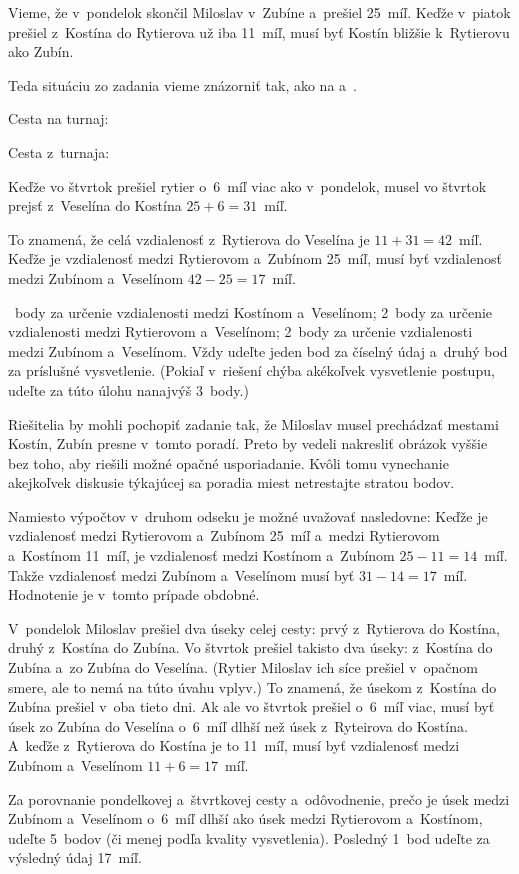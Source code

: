 {%
Vieme, že v~pondelok skončil Miloslav v~Zubíne a~prešiel 25~míľ.
Keďže v~piatok prešiel z~Kostína do Rytierova už iba 11~míľ, musí byť Kostín
bližšie k~Rytierovu ako Zubín.

Teda situáciu zo zadania vieme znázorniť tak, ako na \obr{} a~\obrnum.

Cesta na turnaj:
%

Cesta z~turnaja:
%

Keďže vo štvrtok prešiel rytier o~6~míľ viac ako v~pondelok, musel vo štvrtok
prejsť z~Veselína do Kostína $25 + 6 = 31$~míľ.

To znamená, že celá vzdialenosť z~Rytierova do Veselína je $11 + 31 = 42$~míľ.
Keďže je vzdialenosť medzi Rytierovom a~Zubínom 25~míľ, musí byť vzdialenosť
medzi Zubínom a~Veselínom $42 - 25 = 17$~míľ.


~body za určenie vzdialenosti medzi Kostínom a~Veselínom;
2~body za určenie vzdialenosti medzi Rytierovom a~Veselínom;
2~body za určenie vzdialenosti medzi Zubínom a~Veselínom.
Vždy udeľte jeden bod za číselný údaj a~druhý bod za príslušné vysvetlenie.
(Pokiaľ v~riešení chýba akékoľvek vysvetlenie postupu, udeľte za túto úlohu
nanajvýš 3~body.)
\endhodnotenie

\poznamka
Riešitelia by mohli pochopiť zadanie tak, že Miloslav musel prechádzať
mestami Kostín, Zubín presne v~tomto poradí. Preto by vedeli nakresliť obrázok vyššie
bez toho, aby riešili možné opačné usporiadanie. Kvôli tomu vynechanie akejkoľvek diskusie
týkajúcej sa poradia miest netrestajte stratou bodov.

\poznamka
Namiesto výpočtov v~druhom odseku je možné uvažovať nasledovne:
Keďže je vzdialenosť medzi Rytierovom a~Zubínom 25~míľ a~medzi Rytierovom a~Kostínom 11~míľ, je vzdialenosť medzi Kostínom a~Zubínom $25 - 11 = 14$~míľ.
Takže vzdialenosť medzi Zubínom a~Veselínom musí byť $31 - 14 = 17$~míľ.
Hodnotenie je v~tomto prípade obdobné.

\ineriesenie
V~pondelok Miloslav prešiel dva úseky celej cesty: prvý z~Rytierova do Kostína, druhý z~Kostína do Zubína.
Vo štvrtok prešiel takisto dva úseky: z~Kostína do Zubína a~zo Zubína do Veselína. (Rytier Miloslav ich síce prešiel v~opačnom smere, ale to
nemá na túto úvahu vplyv.) To znamená, že úsekom z~Kostína do Zubína prešiel v~oba tieto dni. Ak ale vo štvrtok prešiel o~6~míľ viac, musí byť úsek zo
Zubína do Veselína o~6~míľ dlhší než úsek z~Ryteirova do Kostína. A~keďže z~Rytierova do Kostína je to 11~míľ, musí byť vzdialenosť medzi Zubínom a~Veselínom $11 + 6 = 17$~míľ.

\hodnotenie
Za porovnanie pondelkovej a~štvrtkovej cesty a~odôvodnenie, prečo je úsek medzi
Zubínom a~Veselínom o~6~míľ dlhší ako úsek medzi Rytierovom a~Kostínom, udeľte
5~bodov (či menej podľa kvality vysvetlenia).
Posledný 1~bod udeľte za výsledný údaj 17~míľ.
\endhodnotenie
}

